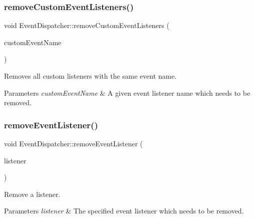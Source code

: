 \subsubsection{\texorpdfstring{remove\+Custom\+Event\+Listeners()}{removeCustomEventListeners()}\hspace{0.1cm}{\footnotesize\ttfamily [2/2]}}
{\footnotesize\ttfamily void Event\+Dispatcher\+::remove\+Custom\+Event\+Listeners (\begin{DoxyParamCaption}\item[{const std\+::string \&}]{custom\+Event\+Name }\end{DoxyParamCaption})}

Removes all custom listeners with the same event name.


\begin{DoxyParams}{Parameters}
{\em custom\+Event\+Name} & A given event listener name which needs to be removed. \\
\hline
\end{DoxyParams}
\mbox{\label{classEventDispatcher_a482553aa81d004ba84ad2f7fc1a99408}} 
\subsubsection{\texorpdfstring{remove\+Event\+Listener()}{removeEventListener()}\hspace{0.1cm}{\footnotesize\ttfamily [1/2]}}
{\footnotesize\ttfamily void Event\+Dispatcher\+::remove\+Event\+Listener (\begin{DoxyParamCaption}\item[{\hyperlink{classEventListener}{Event\+Listener} $\ast$}]{listener }\end{DoxyParamCaption})}

Remove a listener.


\begin{DoxyParams}{Parameters}
{\em listener} & The specified event listener which needs to be removed. \\
\hline
\end{DoxyParams}
\mbox{\label{classEventDispatcher_a482553aa81d004ba84ad2f7fc1a99408}} 
